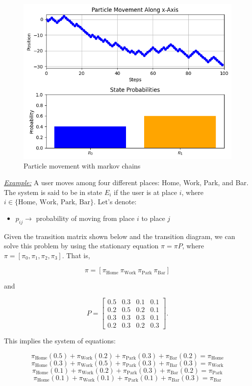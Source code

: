\documentclass[a4paper,10pt]{article}
\begin{document}
\begin{figure}[ht]
    \centering
    \includegraphics[width=0.6\linewidth]{Figures/markov_example_1.png}
    \caption{Particle movement with markov chains}
    \label{fig:markov_example_1}
\end{figure}


\noindent \underline{\textit{Example:}} A user moves among four different places: Home, Work, Park, and Bar. The system is said to be in state $E_i$ if the user is at place $i$, where $i \in \{\text{Home, Work, Park, Bar}\}$. Let's denote:

\begin{itemize}
    \item $p_{ij} \rightarrow$ probability of moving from place $i$ to place $j$
\end{itemize}

Given the transition matrix shown below and the transition diagram, we can solve this problem by using the stationary equation $\pi = \pi P$, where $\pi = [\pi_0, \pi_1, \pi_2, \pi_3]$. That is,

$$
\pi = [\pi_{\text{Home}} \ \pi_{\text{Work}} \ \pi_{\text{Park}} \ \pi_{\text{Bar}}]
$$

and

$$
P = \begin{bmatrix}
0.5 & 0.3 & 0.1 & 0.1 \\ 
0.2 & 0.5 & 0.2 & 0.1 \\ 
0.3 & 0.3 & 0.3 & 0.1 \\ 
0.2 & 0.3 & 0.2 & 0.3
\end{bmatrix}.
$$

This implies the system of equations:

$$
\pi_{\text{Home}}(0.5) + \pi_{\text{Work}}(0.2) + \pi_{\text{Park}}(0.3) + \pi_{\text{Bar}}(0.2) = \pi_{\text{Home}}
$$
$$
\pi_{\text{Home}}(0.3) + \pi_{\text{Work}}(0.5) + \pi_{\text{Park}}(0.3) + \pi_{\text{Bar}}(0.3) = \pi_{\text{Work}}
$$
$$
\pi_{\text{Home}}(0.1) + \pi_{\text{Work}}(0.2) + \pi_{\text{Park}}(0.3) + \pi_{\text{Bar}}(0.2) = \pi_{\text{Park}}
$$
$$
\pi_{\text{Home}}(0.1) + \pi_{\text{Work}}(0.1) + \pi_{\text{Park}}(0.1) + \pi_{\text{Bar}}(0.3) = \pi_{\text{Bar}}
$$
\end{document}
